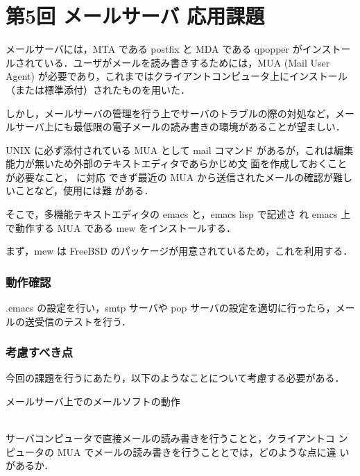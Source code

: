 \section{第5回 メールサーバ 応用課題}

メールサーバには，MTA である postfix と MDA である qpopper がインストー
ルされている．ユーザがメールを読み書きするためには，MUA (Mail User
Agent) が必要であり，これまではクライアントコンピュータ上にインストール
（または標準添付）されたものを用いた．

しかし，メールサーバの管理を行う上でサーバのトラブルの際の対処など，メー
ルサーバ上にも最低限の電子メールの読み書きの環境があることが望ましい．

UNIX に必ず添付されている MUA として mail コマンド
があるが，これは編集能力が無いため外部のテキストエディタであらかじめ文
面を作成しておくことが必要なこと，\textbf{} に対応
できず最近の MUA から送信されたメールの確認が難しいことなど，使用には難
がある．

そこで，多機能テキストエディタの emacs と，emacs lisp で記述さ
れ emacs 上で動作する MUA である mew をインストールする．

まず，mew は FreeBSD のパッケージが用意されているため，これを利用する．

\subsubsection*{動作確認}
.emacs の設定を行い，smtp サーバや pop サーバの設定を適切に行ったら，メー
ルの送受信のテストを行う．

\subsubsection*{考慮すべき点}
今回の課題を行うにあたり，以下のようなことについて考慮する必要がある．
\begin{itemize}
  {\bf \item{メールサーバ上でのメールソフトの動作}}\\
  サーバコンピュータで直接メールの読み書きを行うことと，クライアントコ
  ンピュータの MUA でメールの読み書きを行うこととでは，どのような点に違
  いがあるか．
\end{itemize}
